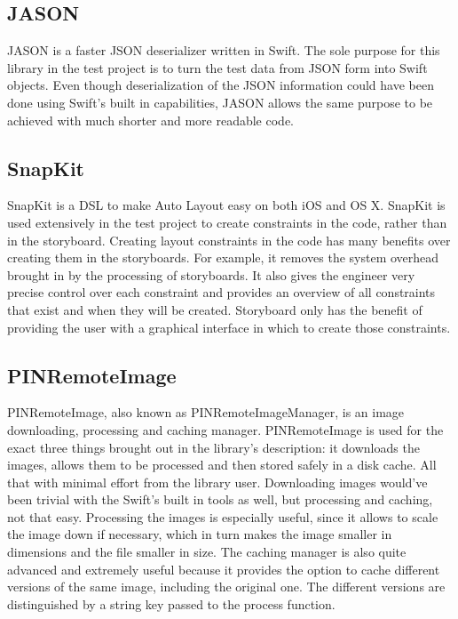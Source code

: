\documentclass[a4paper,12pt]{article}
\begin{document}
\subsection{JASON}
JASON is a faster JSON deserializer written in Swift.\cite{JASON} The sole purpose for this library in the test project is to turn the test data from JSON form into Swift objects. Even though deserialization of the JSON information could have been done using Swift's built in capabilities, JASON allows the same purpose to be achieved with much shorter and more readable code.

\subsection{SnapKit}
SnapKit is a DSL to make Auto Layout easy on both iOS and OS X.\cite{SnapKit} SnapKit is used extensively in the test project to create constraints in the code, rather than in the storyboard. Creating layout constraints in the code has many benefits over creating them in the storyboards. For example, it removes the system overhead brought in by the processing of storyboards. It also gives the engineer very precise control over each constraint and provides an overview of all constraints that exist and when they will be created. Storyboard only has the benefit of providing the user with a graphical interface in which to create those constraints.

\subsection{PINRemoteImage}
PINRemoteImage, also known as PINRemoteImageManager, is an image downloading, processing and caching manager.\cite{PINRemoteImage} PINRemoteImage is used for the exact three things brought out in the library's description: it downloads the images, allows them to be processed and then stored safely in a disk cache. All that with minimal effort from the library user. Downloading images would've been trivial with the Swift's built in tools as well, but processing and caching, not that easy. Processing the images is especially useful, since it allows to scale the image down if necessary, which in turn makes the image smaller in dimensions and the file smaller in size. The caching manager is also quite advanced and extremely useful because it provides the option to cache different versions of the same image, including the original one. The different versions are distinguished by a string key passed to the process function.
\end{document}
